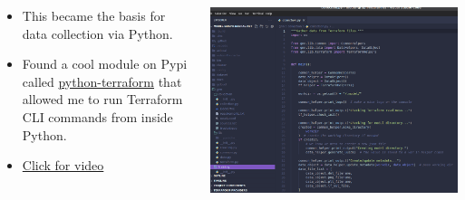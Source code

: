 \documentclass[aspectratio=169]{beamer} %
\begin{document}
\begin{frame}{}
\begin{columns}
\begin{column}{0.5\textwidth}
\begin{itemize}
        \item This became the basis for data collection via Python.
        \item Found a cool module on Pypi called \href{https://pypi.org/project/python-terraform/}{python-terraform} that allowed me to run Terraform CLI commands from inside Python.
        \item \href{https://youtu.be/aTE8uZVO248}{Click for video} %
        \end{itemize}
    \end{column}
    \begin{column}{0.5\textwidth}
    \begin{center}
    \includegraphics[width=1.0\linewidth, height=0.7\textheight]{../images/collection_code.png}
    \end{center}
    \end{column}
    \end{columns}
\end{frame}
\end{document}
